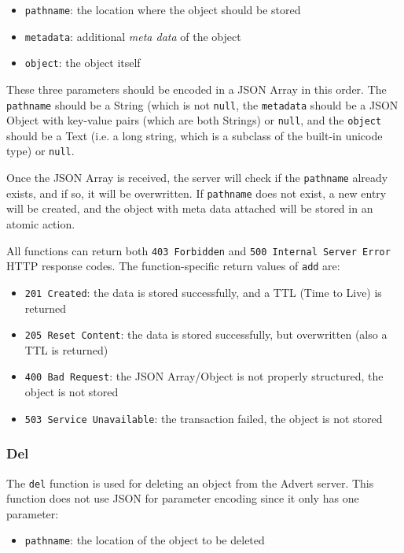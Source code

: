 \begin{itemize}
  \item \texttt{pathname}: the location where the object should be stored
  \item \texttt{metadata}: additional \emph{meta data} of the object
  \item \texttt{object}: the object itself
\end{itemize}

These three parameters should be encoded in a JSON Array in this order. The
\texttt{pathname} should be a String (which is not \texttt{null}, the
\texttt{metadata} should be a JSON Object with key-value pairs (which are both
Strings) or \texttt{null}, and the \texttt{object} should be a Text (i.e. a long
string, which is a subclass of the built-in unicode type) or \texttt{null}.

Once the JSON Array is received, the server will check if the \texttt{pathname}
already exists, and if so, it will be overwritten. If \texttt{pathname} does
not exist, a new entry will be created, and the object with meta data attached
will be stored in an atomic action.

All functions can return both \texttt{403 Forbidden} and \texttt{500 Internal
Server Error} HTTP response codes. The function-specific return values of
\texttt{add} are:

\begin{itemize}
  \item \texttt{201 Created}: the data is stored successfully, and a TTL (Time
  to
  Live) is returned
  \item \texttt{205 Reset Content}: the data is stored successfully, but
  overwritten (also a TTL is returned)
  \item \texttt{400 Bad Request}: the JSON Array/Object is not properly
  structured, the object is not stored
  \item \texttt{503 Service Unavailable}: the transaction failed, the object is
  not stored
\end{itemize}

\subsubsection{Del}
\label{del}
The \texttt{del} function is used for deleting an object from the Advert
server. This function does not use JSON for parameter encoding since it only
has one parameter:

\begin{itemize}
  \item \texttt{pathname}: the location of the object to be deleted
\end{itemize}

